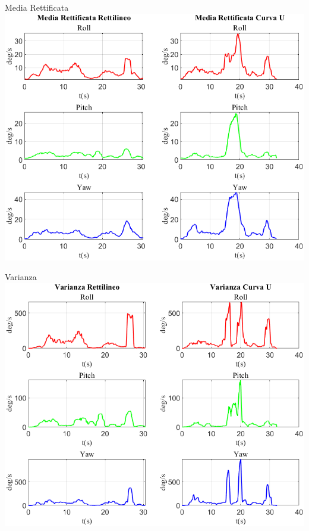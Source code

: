 \documentclass[beamer]{standalone}
\begin{document}
	\begin{frame}{{Media Rettificata}}
		\centering\includegraphics[height=.8\textheight]{figure/VAng/Media Rettificata}
	\end{frame}
	
	\begin{frame}{{Varianza}}
		\centering\includegraphics[height=.8\textheight]{figure/VAng/Varianza}
	\end{frame}
	
\end{document}
